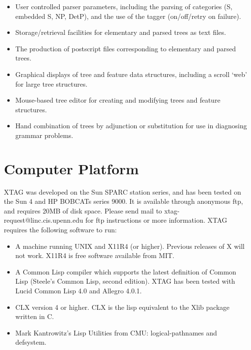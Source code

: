 {\begin{itemize}
\item User controlled parser parameters, including the parsing of
categories (S, embedded S, NP, DetP), and the use of the tagger (on/off/retry
on failure).

\item Storage/retrieval facilities for elementary and parsed trees as
text files.

\item The production of postscript files corresponding to elementary
and parsed trees.

\item Graphical displays of tree and feature data structures,
including a scroll `web' for large tree structures.

\item Mouse-based tree editor for creating and modifying trees and
feature structures.

\item Hand combination of trees by adjunction or substitution for use
in diagnosing grammar problems.

\end{itemize}


\section{Computer Platform}

XTAG was developed on the Sun SPARC station series, and has been tested on the
Sun 4 and HP BOBCATs series 9000.  It is available through anonymous ftp, and
requires 20MB of disk space.  Please send mail to
xtag-request@linc.cis.upenn.edu for ftp instructions or more information.  XTAG
requires the following software to run:

\begin{itemize}

\item A machine running UNIX and X11R4 (or higher). Previous releases of X will
not work.  X11R4 is free software available from MIT.

\item A Common Lisp compiler which supports the latest definition of Common 
Lisp (Steele's Common Lisp, second edition).  XTAG has been tested with Lucid
Common Lisp 4.0 and Allegro 4.0.1.

\item CLX version 4 or higher. CLX is the lisp equivalent to the Xlib package 
written in C.

\item Mark Kantrowitz's Lisp Utilities from CMU: logical-pathnames and
defsystem.


\end{itemize}}
